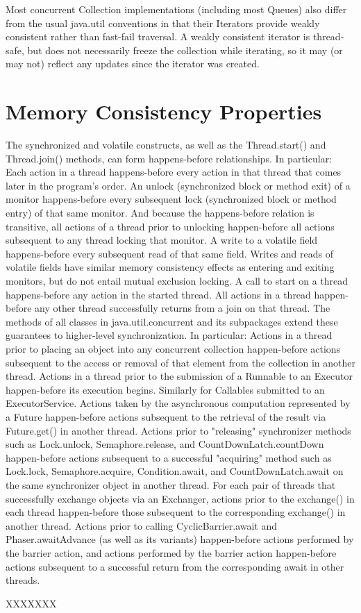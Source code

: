 Most concurrent Collection implementations (including most Queues) also differ from the usual java.util conventions in that their Iterators provide weakly consistent rather than fast-fail traversal. A weakly consistent iterator is thread-safe, but does not necessarily freeze the collection while iterating, so it may (or may not) reflect any updates since the iterator was created.

\section{Memory Consistency Properties}

 The synchronized and volatile constructs, as well as the Thread.start() and Thread.join() methods, can form happens-before relationships. In particular:
Each action in a thread happens-before every action in that thread that comes later in the program's order.
An unlock (synchronized block or method exit) of a monitor happens-before every subsequent lock (synchronized block or method entry) of that same monitor. And because the happens-before relation is transitive, all actions of a thread prior to unlocking happen-before all actions subsequent to any thread locking that monitor.
A write to a volatile field happens-before every subsequent read of that same field. Writes and reads of volatile fields have similar memory consistency effects as entering and exiting monitors, but do not entail mutual exclusion locking.
A call to start on a thread happens-before any action in the started thread.
All actions in a thread happen-before any other thread successfully returns from a join on that thread.
The methods of all classes in java.util.concurrent and its subpackages extend these guarantees to higher-level synchronization. In particular:
Actions in a thread prior to placing an object into any concurrent collection happen-before actions subsequent to the access or removal of that element from the collection in another thread.
Actions in a thread prior to the submission of a Runnable to an Executor happen-before its execution begins. Similarly for Callables submitted to an ExecutorService.
Actions taken by the asynchronous computation represented by a Future happen-before actions subsequent to the retrieval of the result via Future.get() in another thread.
Actions prior to "releasing" synchronizer methods such as Lock.unlock, Semaphore.release, and CountDownLatch.countDown happen-before actions subsequent to a successful "acquiring" method such as Lock.lock, Semaphore.acquire, Condition.await, and CountDownLatch.await on the same synchronizer object in another thread.
For each pair of threads that successfully exchange objects via an Exchanger, actions prior to the exchange() in each thread happen-before those subsequent to the corresponding exchange() in another thread.
Actions prior to calling CyclicBarrier.await and Phaser.awaitAdvance (as well as its variants) happen-before actions performed by the barrier action, and actions performed by the barrier action happen-before actions subsequent to a successful return from the corresponding await in other threads.

XXXXXXX